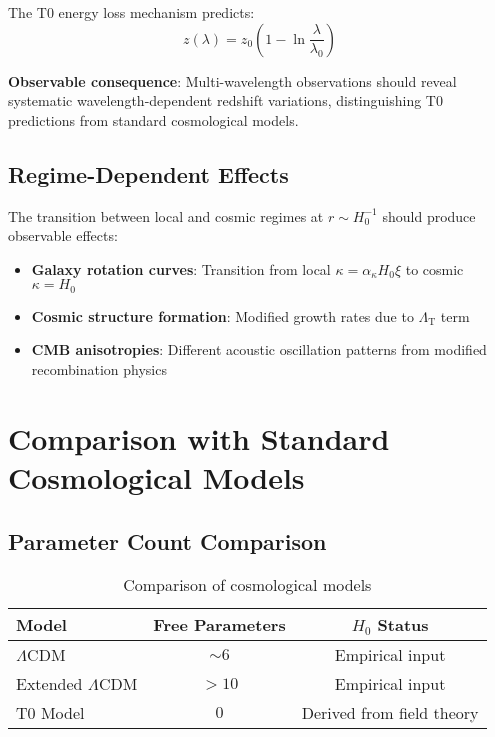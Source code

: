 \documentclass[12pt,a4paper]{article}
\newcommand{\xipar}{\xi}
\newcommand{\LambdaT}{\Lambda_{\text{T}}}
\newcommand{\Hzero}{H_0}
\newcommand{\kappaparam}{\kappa}
\begin{document}
	The T0 energy loss mechanism predicts:
	\begin{equation}
		z(\lambda) = z_0\left(1 - \ln\frac{\lambda}{\lambda_0}\right)
		\label{eq:wavelength_redshift}
	\end{equation}
	
	\textbf{Observable consequence}: Multi-wavelength observations should reveal systematic wavelength-dependent redshift variations, distinguishing T0 predictions from standard cosmological models.
	
	\subsection{Regime-Dependent Effects}
	\label{subsec:regime_effects}
	
	The transition between local and cosmic regimes at $r \sim \Hzero^{-1}$ should produce observable effects:
	
	\begin{itemize}
		\item \textbf{Galaxy rotation curves}: Transition from local $\kappaparam = \alpha_{\kappa} \Hzero \xipar$ to cosmic $\kappaparam = \Hzero$
		\item \textbf{Cosmic structure formation}: Modified growth rates due to $\LambdaT$ term
		\item \textbf{CMB anisotropies}: Different acoustic oscillation patterns from modified recombination physics
	\end{itemize}
	
	\section{Comparison with Standard Cosmological Models}
	\label{sec:model_comparison}
	
	\subsection{Parameter Count Comparison}
	\label{subsec:parameter_comparison}
	
	\begin{table}[htbp]
		\centering
		\begin{tabular}{lcc}
			\toprule
			\textbf{Model} & \textbf{Free Parameters} & \textbf{$H_0$ Status} \\
			\midrule
			$\Lambda$CDM & $\sim 6$ & Empirical input \\
			Extended $\Lambda$CDM & $>10$ & Empirical input \\
			T0 Model & $0$ & Derived from field theory \\
			\bottomrule
		\end{tabular}
		\caption{Comparison of cosmological models}
		\label{tab:model_comparison}
	\end{table}
	
\end{document}
